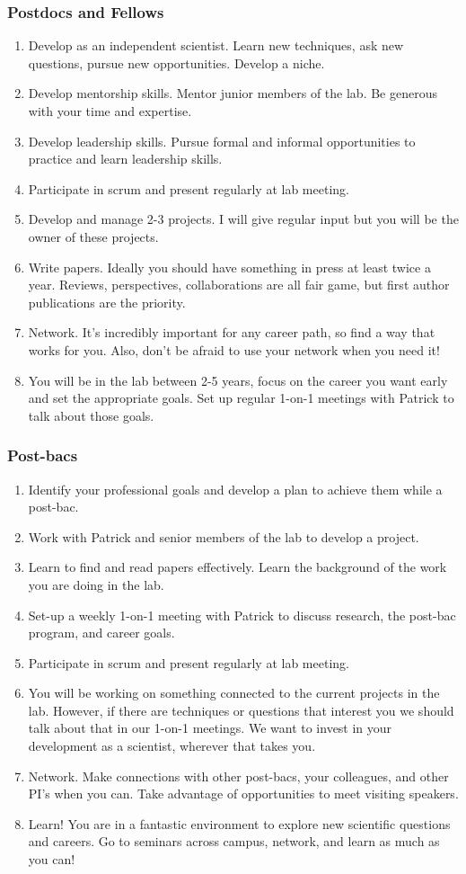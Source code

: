 \documentclass[10pt, letterpaper, twocolumn]{article} %
\begin{document}
\subsubsection{Postdocs and Fellows}
\begin{enumerate}
\item Develop as an independent scientist. Learn new techniques, ask new questions, pursue new opportunities. Develop a niche.
\item Develop mentorship skills. Mentor junior members of the lab. Be generous with your time and expertise.
\item Develop leadership skills. Pursue formal and informal opportunities to practice and learn leadership skills.
\item Participate in scrum and present regularly at lab meeting.
\item Develop and manage 2-3 projects. I will give regular input but you will be the owner of these projects.
\item Write papers. Ideally you should have something in press at least twice a year. Reviews, perspectives, collaborations are all fair game, but first author publications are the priority.
\item Network. It's incredibly important for any career path, so find a way that works for you. Also, don't be afraid to use your network when you need it!
\item You will be in the lab between 2-5 years, focus on the career you want early and set the appropriate goals. Set up regular 1-on-1 meetings with Patrick to talk about those goals.
\end{enumerate}
\subsubsection{Post-bacs}
\begin{enumerate}
\item Identify your professional goals and develop a plan to achieve them while a post-bac.
\item Work with Patrick and senior members of the lab to develop a project.
\item Learn to find and read papers effectively. Learn the background of the work you are doing in the lab.
\item Set-up a weekly 1-on-1 meeting with Patrick to discuss research, the post-bac program, and career goals.
\item Participate in scrum and present regularly at lab meeting.
\item You will be working on something connected to the current projects in the lab. However, if there are techniques or questions that interest you we should talk about that in our 1-on-1 meetings. We want to invest in your development as a scientist, wherever that takes you.
\item Network. Make connections with other post-bacs, your colleagues, and other PI's when you can. Take advantage of opportunities to meet visiting speakers.
\item Learn! You are in a fantastic environment to explore new scientific questions and careers. Go to seminars across campus, network, and learn as much as you can!
\end{enumerate}
\end{document}
